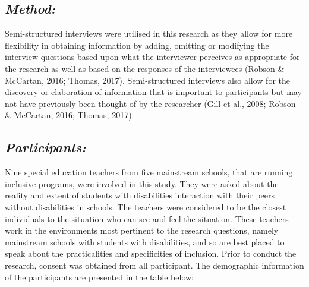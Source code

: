 \documentclass[11.5pt]{sig-alternate}
\begin{document}
\begin{large}
\subsection*{\textit{Method:}}
Semi-structured interviews were utilised in this research as they allow for more flexibility in obtaining information by adding, omitting or modifying the interview questions based upon what the interviewer perceives as appropriate for the research as well as based on the responses of the interviewees (Robson \& McCartan, 2016; Thomas, 2017). Semi-structured interviews also allow for the discovery or elaboration of information that is important to participants but may not have previously been thought of by the researcher (Gill et al., 2008; Robson \& McCartan, 2016; Thomas, 2017). 

\subsection*{\textit{Participants:}}
Nine special education teachers from five mainstream schools, that are running inclusive programs, were involved in this study. They were asked about the reality and extent of students with disabilities interaction with their peers without disabilities in schools. The teachers were considered to be the closest individuals to the situation who can see and feel the situation. These teachers work in the environments most pertinent to the research questions, namely mainstream schools with students with disabilities, and so are best placed to speak about the practicalities and specificities of inclusion.
Prior to conduct the research, consent was obtained from all participant. The demographic information of the participants are presented in the table below:

\begin{table}[h]
\captionsetup{font=large, labelfont=it}
\caption{\textit{Demographic information of the participants}}
\end{table}


\end{large}
\end{document}
